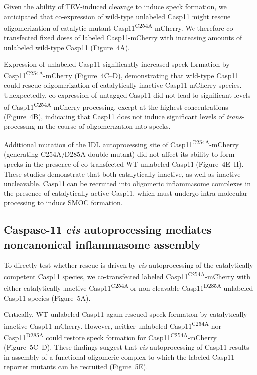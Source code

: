 \documentclass[11pt]{article}
\begin{document}
Given the ability of TEV-induced cleavage to induce speck formation, we anticipated that co-expression of wild-type unlabeled Casp11 might rescue oligomerization of catalytic mutant Casp11\textsuperscript{C254A}-mCherry. We therefore co-transfected fixed doses of labeled Casp11-mCherry with increasing amounts of unlabeled wild-type Casp11 (Figure~4A).

Expression of unlabeled Casp11 significantly increased speck formation by Casp11\textsuperscript{C254A}-mCherry (Figure~4C--D), demonstrating that wild-type Casp11 could rescue oligomerization of catalytically inactive Casp11-mCherry species. Unexpectedly, co-expression of untagged Casp11 did not lead to significant levels of Casp11\textsuperscript{C254A}-mCherry processing, except at the highest concentrations (Figure~4B), indicating that Casp11 does not induce significant levels of \textit{trans}-processing in the course of oligomerization into specks.

Additional mutation of the IDL autoprocessing site of Casp11\textsuperscript{C254A}-mCherry (generating C254A/D285A double mutant) did not affect its ability to form specks in the presence of co-transfected WT unlabeled Casp11 (Figure~4E--H). These studies demonstrate that both catalytically inactive, as well as inactive-uncleavable, Casp11 can be recruited into oligomeric inflammasome complexes in the presence of catalytically active Casp11, which must undergo intra-molecular processing to induce SMOC formation.

\subsection{Caspase-11 \textit{cis} autoprocessing mediates noncanonical inflammasome assembly}

To directly test whether rescue is driven by \textit{cis} autoprocessing of the catalytically competent Casp11 species, we co-transfected labeled Casp11\textsuperscript{C254A}-mCherry with either catalytically inactive Casp11\textsuperscript{C254A} or non-cleavable Casp11\textsuperscript{D285A} unlabeled Casp11 species (Figure~5A).

Critically, WT unlabeled Casp11 again rescued speck formation by catalytically inactive Casp11-mCherry. However, neither unlabeled Casp11\textsuperscript{C254A} nor Casp11\textsuperscript{D285A} could restore speck formation for Casp11\textsuperscript{C254A}-mCherry (Figure~5C--D). These findings suggest that \textit{cis} autoprocessing of Casp11 results in assembly of a functional oligomeric complex to which the labeled Casp11 reporter mutants can be recruited (Figure~5E).
\end{document}
